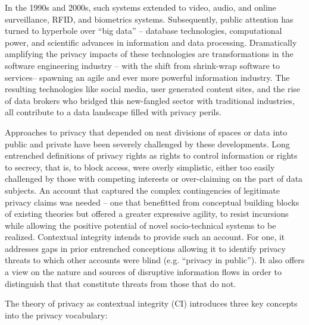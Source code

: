 \documentclass[../thesis.tex]{subfiles}
\begin{document}
In the 1990s and 2000s, such systems extended to video,
audio, and online surveillance, RFID, and biometrics systems.
Subsequently, public attention has turned to hyperbole over
``big data'' -- database technologies, computational
power, and scientific advances in information and data
processing.
Dramatically amplifying the privacy impacts of these
technologies are transformations in the software engineering
industry -- with the
shift from shrink-wrap software to services--
spawning an agile and
ever more powerful information industry.
The resulting technologies
like social media, user generated content sites, and the
rise of data
brokers who bridged this new-fangled sector with traditional
industries, all contribute to a data landscape filled with
privacy perils. 

Approaches to privacy that depended on neat divisions of
spaces or data into public and private have been severely
challenged by these developments.
Long entrenched definitions of privacy rights as rights
to control information or rights to secrecy, that is,
to block access, were overly simplistic, either too easily
challenged by those with competing interests or over-claiming on the part of data subjects. An account that captured the
complex contingencies of legitimate privacy
claims was needed -- one that benefitted from conceptual
building blocks of existing theories but offered a greater
expressive agility,
to resist incursions while allowing the positive potential
of novel socio-technical systems to be realized.
Contextual integrity intends to
provide such an account. For one, it addresses gaps in prior entrenched
conceptions allowing it to identify privacy threats to which other
accounts were blind (e.g. ``privacy in
public''). It also offers a view on the nature and
sources of disruptive information flows in order to distinguish that
that constitute threats from those that do not. 

The theory of privacy as contextual integrity (CI) introduces three
key concepts into the privacy vocabulary:
\end{document}
